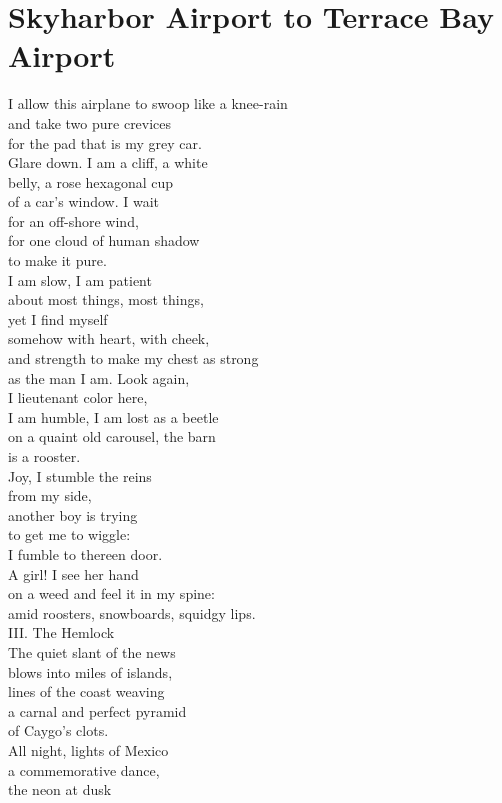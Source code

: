 \documentclass[smalldemyvopaper,11pt,twoside,onecolumn,openright,extrafontsizes]{memoir}
\begin{document}
\chapter{Skyharbor Airport to Terrace Bay Airport}
I allow this airplane to swoop like a knee-rain
\\and take two pure crevices
\\for the pad that is my grey car.
\\Glare down. I am a cliff, a white
\\belly, a rose hexagonal cup
\\of a car's window. I wait
\\for an off-shore wind,
\\for one cloud of human shadow
\\to make it pure.
\\I am slow, I am patient
\\about most things, most things,
\\yet I find myself
\\somehow with heart, with cheek,
\\and strength to make my chest as strong
\\as the man I am. Look again,
\\I lieutenant color here,
\\I am humble, I am lost as a beetle
\\on a quaint old carousel, the barn
\\is a rooster.
\\Joy, I stumble the reins
\\from my side,
\\another boy is trying
\\to get me to wiggle:
\\I fumble to thereen door.
\\A girl! I see her hand
\\on a weed and feel it in my spine:
\\amid roosters, snowboards, squidgy lips.
\\III. The Hemlock
\\The quiet slant of the news
\\blows into miles of islands,
\\lines of the coast weaving
\\a carnal and perfect pyramid
\\of Caygo's clots.
\\All night, lights of Mexico
\\a commemorative dance,
\\the neon at dusk
\end{document}
